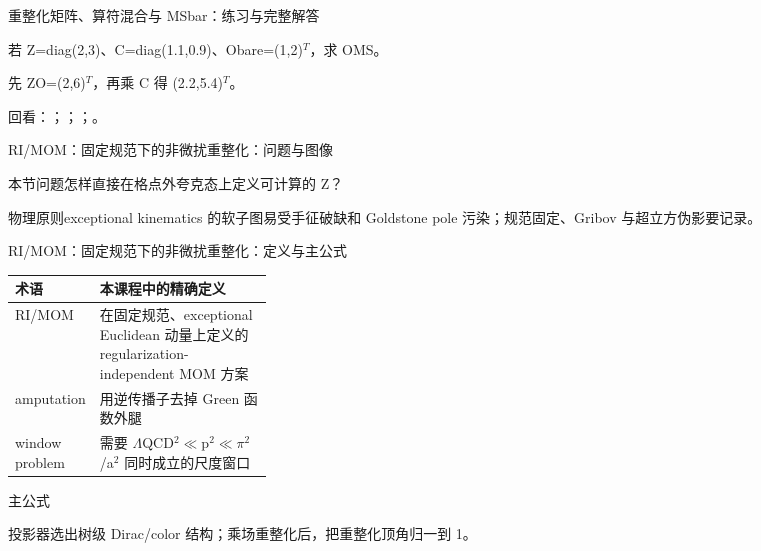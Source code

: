 \begin{frame}[t]{重整化矩阵、算符混合与 MSbar：练习与完整解答}
\footnotesize
\begin{block}{}若 Z=diag(2,3)、C=diag(1.1,0.9)、Obare=(1,2)\ensuremath{^{T}}，求 OMS。\end{block}
\begin{exampleblock}{}先 ZO=(2,6)\ensuremath{^{T}}，再乘 C 得 (2.2,5.4)\ensuremath{^{T}}。\end{exampleblock}
\vfill
\scriptsize 回看：；；；。
\end{frame}

\begin{frame}[t]{RI/\allowbreak{}MOM：固定规范下的非微扰重整化：问题与图像}
\footnotesize
\begin{block}{本节问题}怎样直接在格点外夸克态上定义可计算的 Z？\end{block}
\begin{block}{物理原则}\quad exceptional kinematics 的软子图易受手征破缺和 Goldstone pole 污染；规范固定、Gribov 与超立方伪影要记录。\end{block}
\end{frame}

\begin{frame}[t]{RI/\allowbreak{}MOM：固定规范下的非微扰重整化：定义与主公式}
\footnotesize\begin{tabularx}{\linewidth}{p{0.30\linewidth}Y}
\toprule 术语 & 本课程中的精确定义\\\midrule
{} RI/\allowbreak{}MOM & 在固定规范、exceptional Euclidean 动量上定义的 regularization-independent MOM 方案\\
 amputation & 用逆传播子去掉 Green 函数外腿\\
 window problem & 需要 \ensuremath{\Lambda}QCD\ensuremath{^{2}}\ensuremath{\ll}p\ensuremath{^{2}}\ensuremath{\ll}\ensuremath{\pi}\ensuremath{^{2}}/\allowbreak{}a\ensuremath{^{2}} 同时成立的尺度窗口\\
\bottomrule\end{tabularx}\vspace{0.15cm}
\begin{block}{ 主公式}\centering{}\end{block}
投影器选出树级 Dirac/\allowbreak{}color 结构；乘场重整化后，把重整化顶角归一到 1。
\end{frame}

